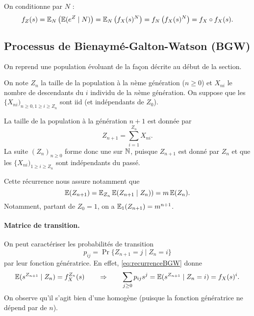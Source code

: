 \proof
On conditionne par $N$ :
\begin{align*}
  f_Z(s) 
  = \operatorname{\mathbb{E}}_N \left(\operatorname{\mathbb{E}}(e^Z \mid N) \right)
  = \operatorname{\mathbb{E}}_N \left(f_X(s)^N \right)
  = f_N \left(f_X(s)^N \right) = f_X \circ f_X(s).
\end{align*}

\eproof

\subsection{Processus de Bienaymé-Galton-Watson (BGW)} 

On reprend une population évoluant de la façon décrite au début de la section. 

On note $Z_n$ la taille de la population à la $n$ème génération ($n \geq 0$) et $X_{ni}$ le nombre de descendants du $i$ individu de la $n$ème génération. 
On suppose que les $\{X_{ni})_{n \geq 0, 1 \geq i \geq Z_n}$ sont iid (et indépendants de $Z_0$).

La taille de la population à la génération $n+1$ est donnée par 
\begin{equation} \label{eq:recurrenceBGW}
Z_{n+1} = \sum_{i = 1}^{Z_n} X_{ni}.
\end{equation}
La suite $(Z_n)_{n \geq 0}$ forme donc une \cM sur $\mathbb{N}$, puisque $Z_{n+1}$ est donné par $Z_n$ et que les $\{X_{ni})_{1 \geq i \geq Z_n}$ sont indépendants du passé.

Cette récurrence nous assure notamment que
$$
\operatorname{\mathbb{E}}(Z_{n+1}) = \operatorname{\mathbb{E}}_{Z_n}\operatorname{\mathbb{E}}(Z_{n+1} \mid Z_n)) = m \operatorname{\mathbb{E}}(Z_n).
$$
Notamment, partant de $Z_0 = 1$, on a $\operatorname{\mathbb{E}}_1(Z_{n+1}) = m^{n+1}$.

\paragraph*{Matrice de transition.} 
On peut caractériser les probabilités de transition 
$$
p_{ij} = \Pr\{Z_{n+1} = j \mid Z_n = i\}
$$
par leur fonction génératrice. En effet, \eqref{eq:recurrenceBGW} donne
$$
\operatorname{\mathbb{E}}(s^{Z_{n+1}} \mid Z_n) = f_X^{Z_n}(s)
\qquad \Rightarrow \qquad 
\sum_{j \geq 0} p_{ij} s^j = \operatorname{\mathbb{E}}(s^{Z_{n+1}} \mid Z_n=i) = f_X(s)^i.
$$
On observe qu'il s'agit bien d'une \cM homogène (puisque la fonction génératrice ne dépend par de $n$).


